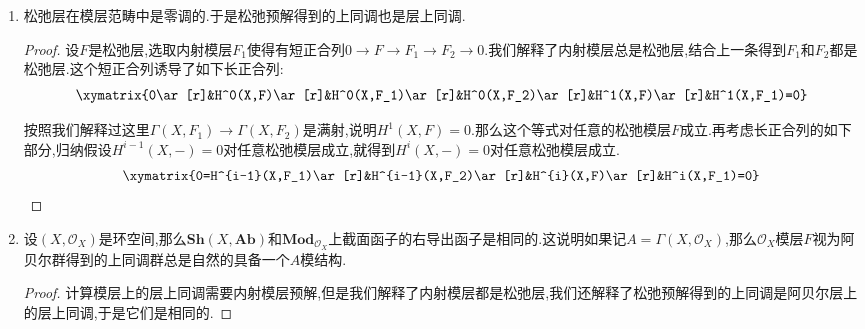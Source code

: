 \begin{enumerate}
\begin{proof}
		短五引理的推论,如果下图中$\rho_1,\rho_2$是满射,那么$\rho_3$是满射.
		$$\xymatrix{0\ar[rr]&&F_1(X)\ar[rr]\ar[d]_{\rho_1}&&F_2(X)\ar[rr]\ar[d]_{\rho_2}&&F_3(X)\ar[d]^{\rho_3}\ar[rr]&&0\\0\ar[rr]&&F_1(U)\ar[rr]&&F_2(U)\ar[rr]&&F_3(U)\ar[rr]&&0}$$
	\end{proof}
	\item 松弛层在模层范畴中是零调的.于是松弛预解得到的上同调也是层上同调.
	\begin{proof}
		
		设$F$是松弛层,选取内射模层$F_1$使得有短正合列$0\to F\to F_1\to F_2\to0$.我们解释了内射模层总是松弛层,结合上一条得到$F_1$和$F_2$都是松弛层.这个短正合列诱导了如下长正合列:
		$$\xymatrix{0\ar[r]&H^0(X,F)\ar[r]&H^0(X,F_1)\ar[r]&H^0(X,F_2)\ar[r]&H^1(X,F)\ar[r]&H^1(X,F_1)=0}$$
		
		按照我们解释过这里$\Gamma(X,F_1)\to\Gamma(X,F_2)$是满射,说明$H^1(X,F)=0$.那么这个等式对任意的松弛模层$F$成立.再考虑长正合列的如下部分,归纳假设$H^{i-1}(X,-)=0$对任意松弛模层成立,就得到$H^i(X,-)=0$对任意松弛模层成立.
		$$\xymatrix{0=H^{i-1}(X,F_1)\ar[r]&H^{i-1}(X,F_2)\ar[r]&H^{i}(X,F)\ar[r]&H^i(X,F_1)=0}$$
	\end{proof}
	\item 设$(X,\mathscr{O}_X)$是环空间,那么$\textbf{Sh}(X,\textbf{Ab})$和$\textbf{Mod}_{\mathscr{O}_X}$上截面函子的右导出函子是相同的.这说明如果记$A=\Gamma(X,\mathscr{O}_X)$,那么$\mathscr{O}_X$模层$F$视为阿贝尔群得到的上同调群总是自然的具备一个$A$模结构.
	\begin{proof}
		
		计算模层上的层上同调需要内射模层预解,但是我们解释了内射模层都是松弛层,我们还解释了松弛预解得到的上同调是阿贝尔层上的层上同调,于是它们是相同的.
	\end{proof}
\end{enumerate}

